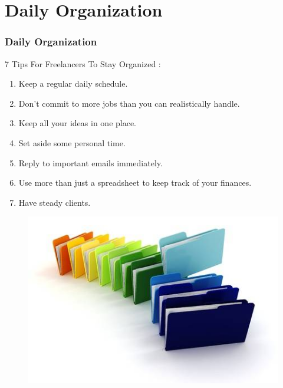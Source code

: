 \section[Daily Organization]{Daily Organization}

\begin{frame}
	\frametitle{Daily Organization}
	\hspace*{-0.5cm}
	7 Tips For Freelancers To Stay Organized :
	\vspace{1cm}
    \hspace*{-0.5cm}
	\begin{minipage}{0.8\linewidth}
	    \vspace{0.5cm}
	    \fontsize{10}{12}\selectfont
	    \begin{enumerate} \itemsep0em
	        \item Keep a regular daily schedule.
	        \item Don't commit to more jobs than you can realistically handle.
	        \item Keep all your ideas in one place.
	        \item Set aside some personal time.
	        \item Reply to important emails immediately.
	        \item Use more than just a spreadsheet to keep track of your finances.
	        \item Have steady clients.
	 \end{enumerate}
	 \end{minipage}
    \hspace*{-1.8cm}
	\begin{minipage}{0.15\linewidth}
	    \begin{figure}
            \includegraphics[scale=0.3]{figures/plan.jpg}
		\end{figure}
	 \end{minipage}
\end{frame}